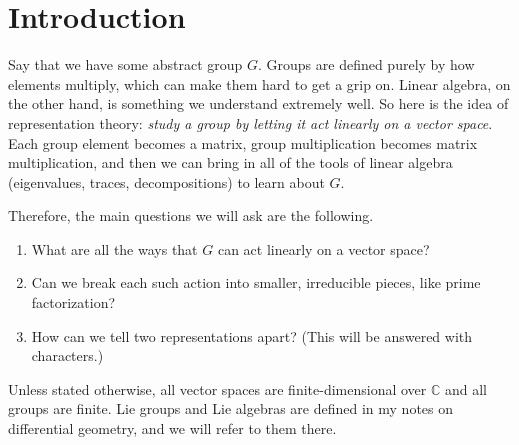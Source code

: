 \section{Introduction}

  Say that we have some abstract group $G$. Groups are defined purely by how elements multiply, which can make them hard to get a grip on. Linear algebra, on the other hand, is something we understand extremely well. So here is the idea of representation theory: \textit{study a group by letting it act linearly on a vector space}. Each group element becomes a matrix, group multiplication becomes matrix multiplication, and then we can bring in all of the tools of linear algebra (eigenvalues, traces, decompositions) to learn about $G$. 

  Therefore, the main questions we will ask are the following. 
  \begin{enumerate}
    \item What are all the ways that $G$ can act linearly on a vector space? 
    \item Can we break each such action into smaller, irreducible pieces, like prime factorization? 
    \item How can we tell two representations apart? (This will be answered with characters.) 
  \end{enumerate}

  Unless stated otherwise, all vector spaces are finite-dimensional over $\mathbb{C}$ and all groups are finite. Lie groups and Lie algebras are defined in my notes on differential geometry, and we will refer to them there. 
